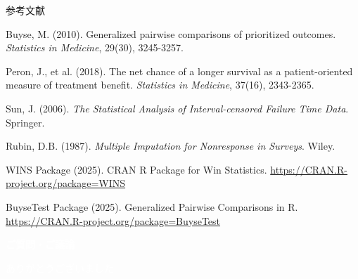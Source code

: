 \documentclass[11pt,aspectratio=169]{beamer}
\begin{document}
\begin{frame}{参考文献}
\begin{thebibliography}{99}
\tiny
{}
Buyse, M. (2010).
Generalized pairwise comparisons of prioritized outcomes.
\textit{Statistics in Medicine}, 29(30), 3245-3257.

Peron, J., et al. (2018).
The net chance of a longer survival as a patient-oriented measure of treatment benefit.
\textit{Statistics in Medicine}, 37(16), 2343-2365.

Sun, J. (2006).
\textit{The Statistical Analysis of Interval-censored Failure Time Data}.
Springer.

Rubin, D.B. (1987).
\textit{Multiple Imputation for Nonresponse in Surveys}.
Wiley.

WINS Package (2025).
CRAN R Package for Win Statistics.
\url{https://CRAN.R-project.org/package=WINS}

BuyseTest Package (2025).
Generalized Pairwise Comparisons in R.
\url{https://CRAN.R-project.org/package=BuyseTest}
\end{thebibliography}
\end{frame}

\begin{frame}[standout]
\Huge \textcolor{white}{\textbf{ご質問・ご議論}}

\vspace{2em}

\Large \textcolor{white}{ありがとうございました}
\end{frame}
\end{document}
